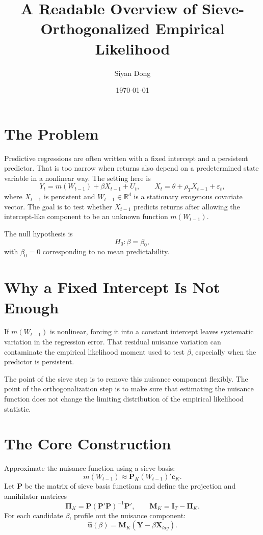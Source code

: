 \documentclass[11pt]{article}
\title{A Readable Overview of Sieve-Orthogonalized Empirical Likelihood}
\author{Siyan Dong}
\date{\today}
\begin{document}
\maketitle

\section{The Problem}

Predictive regressions are often written with a fixed intercept and a persistent predictor. That is too narrow when returns also depend on a predetermined state variable in a nonlinear way. The setting here is
\begin{equation}
    Y_t=m(W_{t-1})+\beta X_{t-1}+U_t,
    \qquad
    X_t=\theta+\rho_T X_{t-1}+\varepsilon_t,
    \label{eq:expo-model}
\end{equation}
where \(X_{t-1}\) is persistent and \(W_{t-1}\in\mathbb R^d\) is a stationary exogenous covariate vector. The goal is to test whether \(X_{t-1}\) predicts returns after allowing the intercept-like component to be an unknown function \(m(W_{t-1})\).

The null hypothesis is
\[
    H_0:\beta=\beta_0,
\]
with \(\beta_0=0\) corresponding to no mean predictability.

\section{Why a Fixed Intercept Is Not Enough}

If \(m(W_{t-1})\) is nonlinear, forcing it into a constant intercept leaves systematic variation in the regression error. That residual nuisance variation can contaminate the empirical likelihood moment used to test \(\beta\), especially when the predictor is persistent.

The point of the sieve step is to remove this nuisance component flexibly. The point of the orthogonalization step is to make sure that estimating the nuisance function does not change the limiting distribution of the empirical likelihood statistic.

\section{The Core Construction}

Approximate the nuisance function using a sieve basis:
\[
    m(W_{t-1})\approx \bm P_K(W_{t-1})'\bm c_K.
\]
Let \(\bm P\) be the matrix of sieve basis functions and define the projection and annihilator matrices
\[
    \bm\Pi_K=\bm P(\bm P'\bm P)^{-1}\bm P',
    \qquad
    \bm M_K=\bm I_T-\bm\Pi_K.
\]
For each candidate \(\beta\), profile out the nuisance component:
\begin{equation}
    \widehat{\bm u}(\beta)=\bm M_K(\bm Y-\beta\bm X_{lag}).
    \label{eq:expo-profile}
\end{equation}
\end{document}
